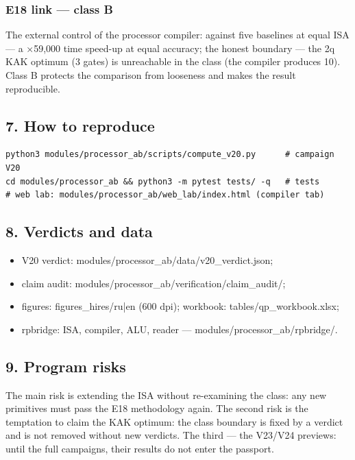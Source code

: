 \documentclass[11pt,a4paper]{article}
\begin{document}
\subsubsection{E18 link — class B}

The external control of the processor compiler: against five baselines at equal ISA — a ×59,000 time speed-up at equal accuracy; the honest boundary — the 2q KAK optimum (3 gates) is unreachable in the class (the compiler produces 10). Class B protects the comparison from looseness and makes the result reproducible.

\subsection{7. How to reproduce}

\begin{verbatim}
python3 modules/processor_ab/scripts/compute_v20.py      # campaign V20
cd modules/processor_ab && python3 -m pytest tests/ -q   # tests
# web lab: modules/processor_ab/web_lab/index.html (compiler tab)
\end{verbatim}

\subsection{8. Verdicts and data}

\begin{itemize}
  \item V20 verdict: modules/processor\_ab/data/v20\_verdict.json;
  \item claim audit: modules/processor\_ab/verification/claim\_audit/;
  \item figures: figures\_hires/ru|en (600 dpi); workbook: tables/qp\_workbook.xlsx;
  \item rpbridge: ISA, compiler, ALU, reader — modules/processor\_ab/rpbridge/.
\end{itemize}

\subsection{9. Program risks}

The main risk is extending the ISA without re-examining the class: any new primitives must pass the E18 methodology again. The second risk is the temptation to claim the KAK optimum: the class boundary is fixed by a verdict and is not removed without new verdicts. The third — the V23/V24 previews: until the full campaigns, their results do not enter the passport.
\end{document}
